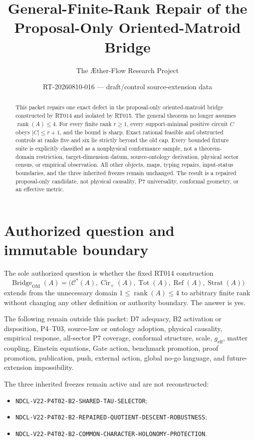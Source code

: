 \documentclass[11pt]{article}
\title{General-Finite-Rank Repair of the Proposal-Only Oriented-Matroid Bridge}
\author{The \AE ther-Flow Research Project}
\date{RT-20260810-016 --- draft/control source-extension data}
\newcommand{\Cstar}{\mathcal{C}^{*}}
\newcommand{\Cirp}{\operatorname{Cir}_{+}}
\newcommand{\Bridge}{\operatorname{Bridge}_{\mathrm{OM}}}
\begin{document}
\maketitle

\begin{abstract}
This packet repairs one exact defect in the proposal-only oriented-matroid
bridge constructed by RT014 and isolated by RT015.  The general theorem no
longer assumes $\operatorname{rank}(A)\le4$.  For every finite rank $r\ge1$,
every support-minimal positive circuit $C$ obeys
$|C|\le r+1$, and the bound is sharp.  Exact rational feasible and obstructed
controls at ranks five and six lie strictly beyond the old cap.  Every bounded
fixture suite is explicitly classified as a nonphysical conformance sample,
not a theorem-domain restriction, target-dimension datum, source-ontology
derivation, physical sector census, or empirical observation.  All other
objects, maps, typing repairs, input-status boundaries, and the three inherited
freezes remain unchanged.  The result is a repaired proposal-only candidate,
not physical causality, P7 universality, conformal geometry, or an effective
metric.
\end{abstract}

\section{Authorized question and immutable boundary}

The sole authorized question is whether the fixed RT014 construction
\[
 \Bridge(A)=\bigl(\Cstar(A),\Cirp(A),\operatorname{Tot}(A),
 \operatorname{Ref}(A),\operatorname{Strat}(A)\bigr)
\]
extends from the unnecessary domain
$1\le\operatorname{rank}(A)\le4$ to arbitrary finite rank without changing
any other definition or authority boundary.  The answer is yes.

The following remain outside this packet: D7 adequacy, B2 activation or
disposition, P4--T03, source-law or ontology adoption, physical causality,
empirical response, all-sector P7 coverage, conformal structure, scale,
$g_{\mathrm{eff}}$, matter coupling, Einstein equations, Gate action,
benchmark promotion, proof promotion, publication, push, external action,
global no-go language, and future-extension impossibility.

The three inherited freezes remain active and are not reconstructed:
\begin{itemize}[leftmargin=*]
  \item \texttt{NDCL-V22-P4T02-B2-SHARED-TAU-SELECTOR};
  \item \texttt{NDCL-V22-P4T02-B2-REPAIRED-QUOTIENT-DESCENT-ROBUSTNESS};
  \item \texttt{NDCL-V22-P4T02-B2-COMMON-CHARACTER-HOLONOMY-PROTECTION}.
\end{itemize}
\end{document}

